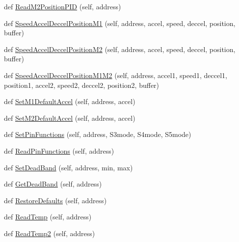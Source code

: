 \begin{DoxyCompactItemize}
\item 
def \mbox{\hyperlink{classtoxic__hardware_1_1roboclaw__3_1_1Roboclaw_a88fdebf9a672c22ff3789719b39dd994}{Read\+M2\+Position\+P\+ID}} (self, address)
\item 
def \mbox{\hyperlink{classtoxic__hardware_1_1roboclaw__3_1_1Roboclaw_a1b4d92f94801f58a9890c9587bd028af}{Speed\+Accel\+Deccel\+Position\+M1}} (self, address, accel, speed, deccel, position, buffer)
\item 
def \mbox{\hyperlink{classtoxic__hardware_1_1roboclaw__3_1_1Roboclaw_ae7008907206f5accff98fe60a85dc124}{Speed\+Accel\+Deccel\+Position\+M2}} (self, address, accel, speed, deccel, position, buffer)
\item 
def \mbox{\hyperlink{classtoxic__hardware_1_1roboclaw__3_1_1Roboclaw_a67d7a0f215dd04abdc264e6f86186542}{Speed\+Accel\+Deccel\+Position\+M1\+M2}} (self, address, accel1, speed1, deccel1, position1, accel2, speed2, deccel2, position2, buffer)
\item 
def \mbox{\hyperlink{classtoxic__hardware_1_1roboclaw__3_1_1Roboclaw_a23dc1a25b115d6e1cecdfacdaef1a723}{Set\+M1\+Default\+Accel}} (self, address, accel)
\item 
def \mbox{\hyperlink{classtoxic__hardware_1_1roboclaw__3_1_1Roboclaw_a039c9127b396a47d39682cf528d66fd4}{Set\+M2\+Default\+Accel}} (self, address, accel)
\item 
def \mbox{\hyperlink{classtoxic__hardware_1_1roboclaw__3_1_1Roboclaw_ac54b2cb80b2ab567fb290a6c376c07a7}{Set\+Pin\+Functions}} (self, address, S3mode, S4mode, S5mode)
\item 
def \mbox{\hyperlink{classtoxic__hardware_1_1roboclaw__3_1_1Roboclaw_a514dcfe31df7d312ed3d2a45666500c3}{Read\+Pin\+Functions}} (self, address)
\item 
def \mbox{\hyperlink{classtoxic__hardware_1_1roboclaw__3_1_1Roboclaw_a5c7b72a7a931b568bb6598b3c9c88dde}{Set\+Dead\+Band}} (self, address, min, max)
\item 
def \mbox{\hyperlink{classtoxic__hardware_1_1roboclaw__3_1_1Roboclaw_afc265149c1e2c828615710da9984db1a}{Get\+Dead\+Band}} (self, address)
\item 
def \mbox{\hyperlink{classtoxic__hardware_1_1roboclaw__3_1_1Roboclaw_ae963de53e2a3be675dc00949c099140a}{Restore\+Defaults}} (self, address)
\item 
def \mbox{\hyperlink{classtoxic__hardware_1_1roboclaw__3_1_1Roboclaw_a4d3216ee6c9260f2ebd116bf6c057d0c}{Read\+Temp}} (self, address)
\item 
def \mbox{\hyperlink{classtoxic__hardware_1_1roboclaw__3_1_1Roboclaw_a2ad329a177d6b02dfd1cd59163c129c5}{Read\+Temp2}} (self, address)

\end{DoxyCompactItemize}
